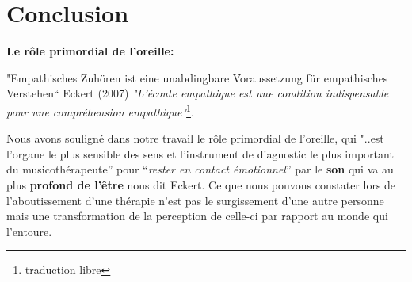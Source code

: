 













\chapter{ Conclusion }

\textbf{Le rôle primordial de l'oreille:}

"Empathisches Zuhören ist eine unabdingbare Voraussetzung für empathisches Verstehen“ 
\autocite[p.46]{seminar_zuerich} Eckert (2007)
\textit{"L'écoute empathique est une condition indispensable
	pour une compréhension empathique"}\footnote{traduction libre}.


Nous avons souligné dans notre travail le rôle primordial de
l'oreille, qui "..est l'organe le plus sensible des
sens et l'instrument de diagnostic le plus important du
musicothérapeute'' pour ``\textit{rester en contact émotionnel}'' par le \textbf{son} qui va au plus 
\textbf{profond de
	l'être} nous dit Eckert.
Ce que nous pouvons constater lors de l'aboutissement
d'une thérapie n'est pas le surgissement d'une autre personne mais une transformation
de la perception de celle-ci par rapport au monde qui l'entoure.



